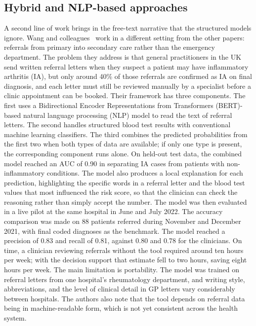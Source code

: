 \documentclass[11pt]{article}
\begin{document}
\subsection{Hybrid and NLP-based approaches}

A second line of work brings in the free-text narrative that the structured models ignore. Wang and colleagues~\cite{Wang2023} work in a different setting from the other papers: referrals from primary into secondary care rather than the emergency department. The problem they address is that general practitioners in the UK send written referral letters when they suspect a patient may have inflammatory arthritis (IA), but only around 40\% of those referrals are confirmed as IA on final diagnosis, and each letter must still be reviewed manually by a specialist before a clinic appointment can be booked. Their framework has three components. The first uses a Bidirectional Encoder Representations from Transformers (BERT)-based natural language processing (NLP) model to read the text of referral letters. The second handles structured blood test results with conventional machine learning classifiers. The third combines the predicted probabilities from the first two when both types of data are available; if only one type is present, the corresponding component runs alone. On held-out test data, the combined model reached an AUC of 0.90 in separating IA cases from patients with non-inflammatory conditions. The model also produces a local explanation for each prediction, highlighting the specific words in a referral letter and the blood test values that most influenced the risk score, so that the clinician can check the reasoning rather than simply accept the number. The model was then evaluated in a live pilot at the same hospital in June and July 2022. The accuracy comparison was made on 88 patients referred during November and December 2021, with final coded diagnoses as the benchmark. The model reached a precision of 0.83 and recall of 0.81, against 0.80 and 0.78 for the clinicians. On time, a clinician reviewing referrals without the tool required around ten hours per week; with the decision support that estimate fell to two hours, saving eight hours per week. The main limitation is portability. The model was trained on referral letters from one hospital's rheumatology department, and writing style, abbreviations, and the level of clinical detail in GP letters vary considerably between hospitals. The authors also note that the tool depends on referral data being in machine-readable form, which is not yet consistent across the health system.
\end{document}
